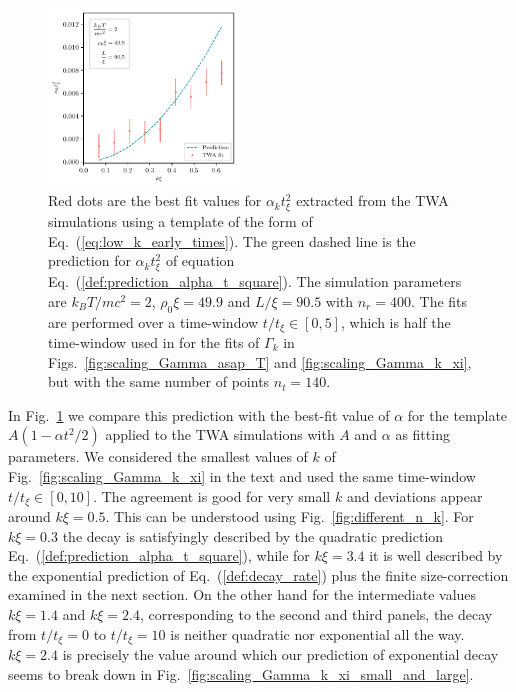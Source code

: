 \documentclass[aps,prd,notitlepage,amsfonts,amssymb,amsmath,nofootinbib,superscriptaddress,longbibliography]{revtex4-2}
\begin{document}
\begin{appendices}
\begin{figure}
    \centering
    \includegraphics[width=0.45\textwidth]{fig10.pdf}
    \caption{Red dots are the best fit values for $\alpha_k t_{\xi}^2$  extracted from the TWA simulations using a template of the form of Eq.~(\ref{eq:low_k_early_times}). The green dashed line is the prediction for $\alpha_k t_{\xi}^2$ of equation Eq.~(\ref{def:prediction_alpha_t_square}).
    The simulation parameters are $k_{B} T/ m c^2=2$, $\rho_0 \xi = 49.9$ and $L/\xi = 90.5$ with $n_r = 400$. The fits are performed over a time-window $t / t_{\xi} \in \left[ 0, 5\right]$, which is half the time-window used in for the fits of $\Gamma_{k}$ in Figs.~\ref{fig:scaling_Gamma_asap_T} and \ref{fig:scaling_Gamma_k_xi}, but with the same number of points $n_{t}=140$.
    \label{fig:scaling_alpha_k} }
\end{figure}


In Fig.~\ref{fig:scaling_alpha_k} we compare this prediction with the best-fit value of $\alpha$ for the template $A\left( 1 - \alpha t^2 / 2\right)$ applied to the TWA simulations with $A$ and $\alpha$ as fitting parameters. We considered the smallest values of $k$ of Fig.~\ref{fig:scaling_Gamma_k_xi} in the text and used the same time-window $t / t_{\xi} \in \left[ 0, 10\right]$. The agreement is good for very small $k$ and deviations appear around $k \xi = 0.5$. This can be understood using Fig.~\ref{fig:different_n_k}. For $k \xi = 0.3$ the decay is satisfyingly described by the quadratic prediction Eq.~(\ref{def:prediction_alpha_t_square}), while for $k \xi = 3.4$ it is well described by the exponential prediction of Eq.~(\ref{def:decay_rate}) plus the finite size-correction examined in the next section. On the other hand for the intermediate values $k \xi = 1.4$ and $k \xi = 2.4$, corresponding to the second and third panels, the decay from $t/ t_{\xi} = 0$ to $t/ t_{\xi} = 10$ is neither quadratic nor exponential all the way. $k \xi = 2.4$ is precisely the value around which our prediction of exponential decay seems to break down in Fig.~\ref{fig:scaling_Gamma_k_xi_small_and_large}.





\end{appendices}
\end{document}
